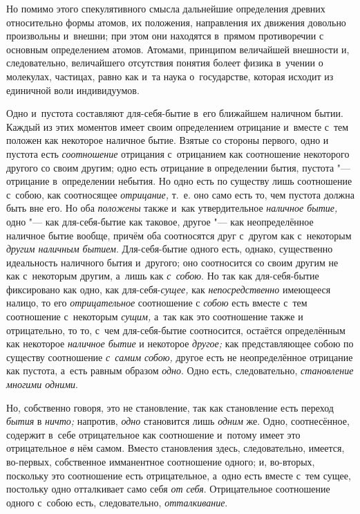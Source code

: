 Но помимо этого спекулятивного смысла дальнейшие определения древних
относительно формы атомов, их положения, направления их движения довольно
произвольны и~внешни; при этом они находятся в~прямом противоречии с
основным определением атомов. Атомами, принципом величайшей внешности и,
следовательно, величайшего отсутствия понятия болеет физика в~учении о
молекулах, частицах, равно как и~та наука о~государстве, которая исходит из
единичной воли индивидуумов.


Одно и~пустота составляют для-себя-бытие в~его ближайшем наличном бытии.
Каждый из этих моментов имеет своим определением отрицание и~вместе с~тем
положен как некоторое наличное бытие. Взятые со стороны первого, одно и
пустота есть {\em соотношение} отрицания с~отрицанием
как соотношение некоторого другого со своим другим; одно есть отрицание в
определении бытия, пустота "--- отрицание в~определении небытия. Но одно есть
по существу лишь соотношение с~собою, как соотносящее
{\em отрицание,} т.~е. оно само есть то, чем пустота
должна быть вне его. Но оба {\em положены} также и~как
утвердительное {\em наличное бытие,} одно "--- как
для-себя-бытие как таковое, другое "--- как неопределённое наличное бытие
вообще, причём оба соотносятся друг с~другом как с~некоторым
{\em другим наличным бытием}. Для-себя-бытие одного
есть, однако, существенно идеальность наличного бытия и~другого; оно
соотносится со своим другим не как с~некоторым другим, а~лишь как
{\em с~собою}. Но так как для-себя-бытие фиксировано
как одно, как для-себя-{\em сущее,} как
{\em непосредственно} имеющееся налицо, то его
{\em отрицательное} соотношение с
{\em собою} есть вместе с~тем соотношение с~некоторым
{\em сущим,} а~так как это соотношение также и
отрицательно, то то, с~чем для-себя-бытие соотносится, остаётся
определённым как некоторое {\em наличное бытие} и
некоторое {\em другое;} как представляющее собою по
существу соотношение {\em с~самим собою,} другое есть
не неопределённое отрицание как пустота, а~есть равным образом
{\em одно}. Одно есть, следовательно, {\em становление многими одними}.

Но, собственно говоря, это не становление, так как становление есть переход
{\em бытия} в {\em ничто;} напротив, {\em одно} становится лишь
{\em одним} же. Одно, соотнесённое, содержит в~себе
отрицательное как соотношение и~потому имеет это отрицательное
{\em в} нём самом. Вместо становления здесь,
следовательно, имеется, во-первых, собственное имманентное соотношение
одного; и, во-вторых, поскольку это соотношение есть отрицательное, а~одно
есть вместе с~тем сущее, постольку одно отталкивает само себя
{\em от себя}. Отрицательное соотношение одного с~собою
есть, следовательно, {\em отталкивание}.

